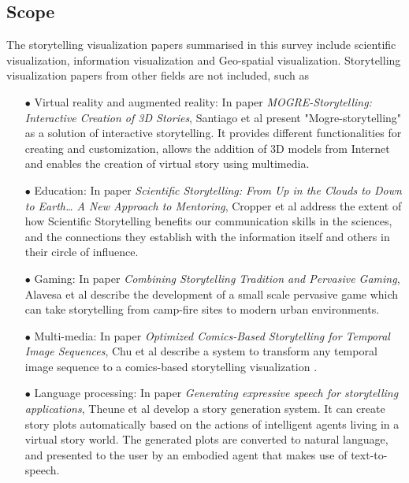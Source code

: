 \documentclass{egpubl}
\begin{document}
\subsection{Scope}
The storytelling visualization papers summarised in this survey include scientific visualization, information visualization and Geo-spatial visualization. Storytelling visualization papers from other fields are not included, such as
\begin{enumerate}
\item[$\bullet$] Virtual reality and augmented reality: In paper \textit{MOGRE-Storytelling: Interactive Creation of 3D Stories}, Santiago et al \cite{santiago2014mogre} present "Mogre-storytelling" as a solution of interactive storytelling. It provides different functionalities for creating and customization, allows the addition of 3D models from Internet and enables the creation of virtual story using multimedia.
\item[$\bullet$] Education:  In paper \textit{Scientific Storytelling: From Up in the Clouds to Down to Earth… A New Approach to Mentoring}, Cropper et al \cite{cropper2015scientific} address the extent of how Scientific Storytelling benefits our communication skills in the sciences, and the connections they establish with the information itself and others in their circle of influence.
\item[$\bullet$] Gaming: In paper \textit{Combining Storytelling Tradition and Pervasive Gaming}, Alavesa et al\cite{alavesa2013combining} describe the development of a small scale pervasive game which can take storytelling from camp-fire sites to modern urban environments. 
\item[$\bullet$] Multi-media: In paper \textit{Optimized Comics-Based Storytelling for Temporal Image Sequences}, Chu et al describe a system to transform any temporal image sequence to a comics-based storytelling visualization \cite{chu2015}. 
\item[$\bullet$] Language processing: In paper \textit{Generating expressive speech for storytelling applications}, Theune et al \cite{theune2006generating} develop a story generation system. It can create story plots automatically based on the actions of intelligent agents living in a virtual story world. The generated plots are converted to natural language, and presented to the user by an embodied agent that makes use of text-to-speech.
\end{enumerate}
\end{document}
